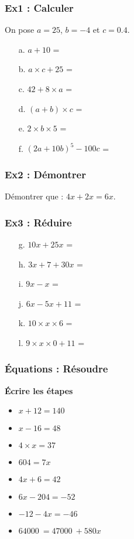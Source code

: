 \subsubsection*{Ex1 : Calculer}

On pose $a = 25$, $b = -4$ et $c = 0.4$.

\begin{enumerate}
  \item[a.] $a + 10$ = \dotfill 
  \item[b.] $a \times c + 25$ = \dotfill 
  \item[c.] $42 + 8 \times a$ = \dotfill 
  \item[d.] $(a + b)\times c$ = \dotfill 
  \item[e.] $2 \times b \times 5$ = \dotfill 
  \item[f.] $(2a + 10b)^5 - 100c$ = \dotfill 
\end{enumerate}


\subsubsection*{Ex2 : Démontrer}

Démontrer que : $4x + 2x = 6x$.
\Pointilles[2]

\subsubsection*{Ex3 : Réduire}

\begin{enumerate}
  \item[g.] $10x + 25x$ = \dotfill 
  \item[h.] $3x + 7 + 30x$ = \dotfill 
  \item[i.] $9x - x$ = \dotfill 
  \item[j.] $6x - 5x + 11$ = \dotfill 
  \item[k.] $10 \times x \times 6$ = \dotfill 
  \item[l.] $9 \times x \times 0 + 11$ = \dotfill 
\end{enumerate}

\subsubsection*{Équations : Résoudre}
\textbf{Écrire les étapes}

\begin{itemize}[label={$\bullet$}]
\item $x + 12 = 140$
\item $x - 16 = 48$
\item $4 \times x = 37$
\item $604 = 7x$
\item $4x + 6 = 42$
\item $6x - 204 = -52$
\item $-12 - 4x = -46$
\item $\SI{64000}{} = \SI{47000}{} + 580x$
\end{itemize}

